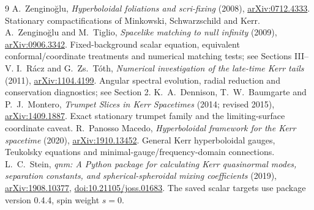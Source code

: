 \documentclass[11pt,letterpaper]{article}
\begin{document}
\clearpage
\begin{thebibliography}{9}
 A.~Zengino\u glu, \emph{Hyperboloidal foliations and scri-fixing} (2008), \href{https://arxiv.org/abs/0712.4333}{arXiv:0712.4333}. Stationary compactifications of Minkowski, Schwarzschild and Kerr.
 A.~Zengino\u glu and M.~Tiglio, \emph{Spacelike matching to null infinity} (2009), \href{https://arxiv.org/abs/0906.3342}{arXiv:0906.3342}. Fixed-background scalar equation, equivalent conformal/coordinate treatments and numerical matching tests; see Sections III--V.
 I.~R\'acz and G.~Zs.~T\'oth, \emph{Numerical investigation of the late-time Kerr tails} (2011), \href{https://arxiv.org/abs/1104.4199}{arXiv:1104.4199}. Angular spectral evolution, radial reduction and conservation diagnostics; see Section 2.
 K.~A.~Dennison, T.~W.~Baumgarte and P.~J.~Montero, \emph{Trumpet Slices in Kerr Spacetimes} (2014; revised 2015), \href{https://arxiv.org/abs/1409.1887}{arXiv:1409.1887}. Exact stationary trumpet family and the limiting-surface coordinate caveat.
 R.~Panosso Macedo, \emph{Hyperboloidal framework for the Kerr spacetime} (2020), \href{https://arxiv.org/abs/1910.13452}{arXiv:1910.13452}. General Kerr hyperboloidal gauges, Teukolsky equations and minimal-gauge/frequency-domain connections.
 L.~C.~Stein, \emph{qnm: A Python package for calculating Kerr quasinormal modes, separation constants, and spherical-spheroidal mixing coefficients} (2019), \href{https://arxiv.org/abs/1908.10377}{arXiv:1908.10377}, \href{https://doi.org/10.21105/joss.01683}{doi:10.21105/joss.01683}. The saved scalar targets use package version 0.4.4, spin weight $s=0$.
\end{thebibliography}
\end{document}
